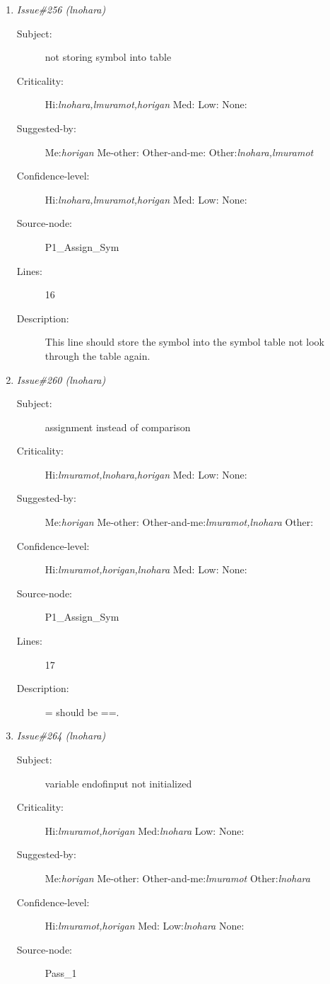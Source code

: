 \begin{enumerate}
\begin{description}
\item [Lines:] 12

\item [Description:] This line is supposed to check if there is a
label to add to the symbol table.
\end{description}
\item {\it Issue\#256 (lnohara)}
\begin{description}
\item [Subject:] not storing symbol into table
\item [Criticality:] Hi:{\it lnohara,lmuramot,horigan} Med:{\it } Low:{\it } None:{\it }
\item [Suggested-by:] Me:{\it horigan} Me-other:{\it } Other-and-me:{\it } Other:{\it lnohara,lmuramot}
\item [Confidence-level:] Hi:{\it lnohara,lmuramot,horigan} Med:{\it } Low:{\it } None:{\it }
\item [Source-node:] P1\_Assign\_Sym

\item [Lines:] 16

\item [Description:] This line should store the symbol into the
symbol table not look through the table again.
\end{description}
\item {\it Issue\#260 (lnohara)}
\begin{description}
\item [Subject:] assignment instead of comparison
\item [Criticality:] Hi:{\it lmuramot,lnohara,horigan} Med:{\it } Low:{\it } None:{\it }
\item [Suggested-by:] Me:{\it horigan} Me-other:{\it } Other-and-me:{\it lmuramot,lnohara} Other:{\it }
\item [Confidence-level:] Hi:{\it lmuramot,horigan,lnohara} Med:{\it } Low:{\it } None:{\it }
\item [Source-node:] P1\_Assign\_Sym

\item [Lines:] 17

\item [Description:] = should be ==.
\end{description}
\item {\it Issue\#264 (lnohara)}
\begin{description}
\item [Subject:] variable endofinput not initialized
\item [Criticality:] Hi:{\it lmuramot,horigan} Med:{\it lnohara} Low:{\it } None:{\it }
\item [Suggested-by:] Me:{\it horigan} Me-other:{\it } Other-and-me:{\it lmuramot} Other:{\it lnohara}
\item [Confidence-level:] Hi:{\it lmuramot,horigan} Med:{\it } Low:{\it lnohara} None:{\it }
\item [Source-node:] Pass\_1


\end{description}
\end{enumerate}
